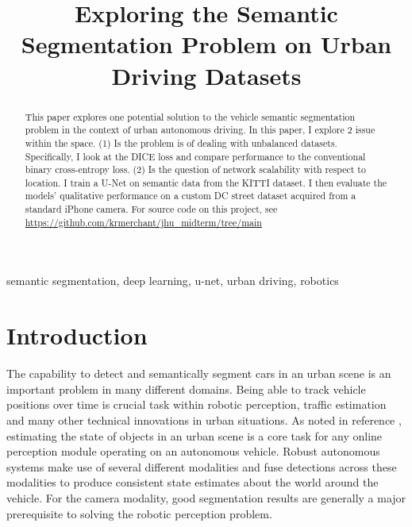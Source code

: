 \documentclass[Location Location Location! : Exploring Image Segmentation Problem In Urban Driving Scenarios]{IEEEtran}
\begin{document}
\title{Exploring the Semantic Segmentation Problem on Urban Driving Datasets\\

}

\author{
}

\maketitle

\begin{abstract}
This paper explores one potential solution to the vehicle semantic segmentation problem in the context of urban autonomous driving. In this paper, I explore 2 issue within the space. (1) Is the problem is of dealing with unbalanced datasets. Specifically, I look at the DICE loss and compare performance to the conventional binary cross-entropy loss. (2) Is the question of network scalability with respect to location. I train a U-Net on semantic data from the KITTI \cite{kitti} dataset. I then evaluate the models' qualitative performance on a custom DC street dataset acquired from a standard iPhone camera. For source code on this project, see \url{https://github.com/krmerchant/jhu_midterm/tree/main}


\end{abstract}

\begin{IEEEkeywords}
semantic segmentation, deep learning, u-net, urban driving, robotics
\end{IEEEkeywords}



\section{Introduction}  
The capability to detect and semantically segment cars in an urban scene is an important problem in many different domains. Being able to track vehicle positions over time is crucial task within robotic perception, traffic estimation and many other technical innovations in urban situations. As noted in reference \cite{sensor-fusion}, estimating the state of objects in an urban scene is a core task for any online perception module operating on an autonomous vehicle. Robust autonomous systems make use of several different modalities and fuse detections across these modalities to produce consistent state estimates about the world around the vehicle. For the camera modality, good segmentation results are generally a major prerequisite to solving the robotic perception problem.  
\end{document}
